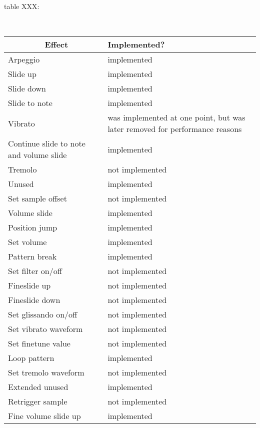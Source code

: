 table XXX:
\begin{table}
        \begin{tabular}{|l|l|}

        \hline
        Effect & Implemented? \\
        \hline
        \hline
        Arpeggio & implemented \\
        \hline
        Slide up & implemented \\
        \hline
        Slide down & implemented \\
        \hline
        Slide to note & implemented \\
        \hline
        Vibrato & was implemented at one point, but was later removed for performance reasons \\
        \hline
        Continue slide to note and volume slide & implemented \\
        \hline
        Tremolo & not implemented \\
        \hline
        Unused & implemented \\
        \hline
        Set sample offset & not implemented \\
        \hline
        Volume slide & implemented \\
        \hline
        Position jump & implemented \\
        \hline
        Set volume & implemented \\
        \hline
        Pattern break & implemented \\
        \hline
        Set filter on/off & not implemented \\
        \hline
        Fineslide up & not implemented \\
        \hline
        Fineslide down & not implemented \\
        \hline
        Set glissando on/off & not implemented \\
        \hline
        Set vibrato waveform & not implemented \\
        \hline
        Set finetune value & not implemented \\
        \hline
        Loop pattern & implemented \\
        \hline
        Set tremolo waveform & not implemented \\
        \hline
        Extended unused & implemented \\
        \hline
        Retrigger sample & not implemented \\
        \hline
        Fine volume slide up & implemented \\

\end{tabular}
\end{table}
